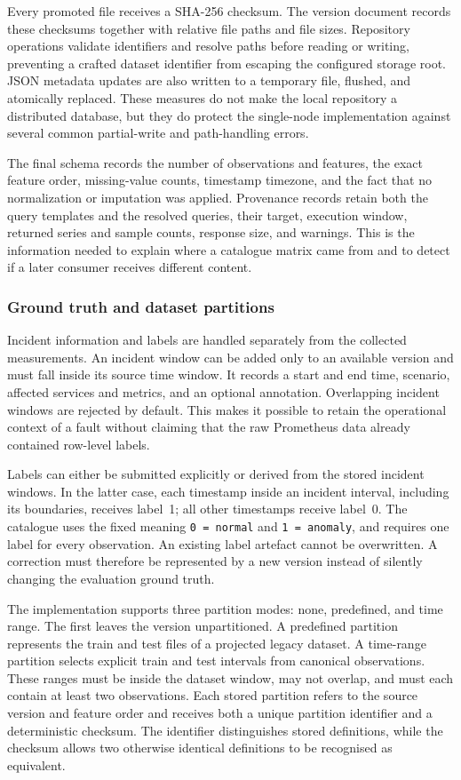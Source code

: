 Every promoted file receives a SHA-256 checksum. The version document records these checksums together with relative file paths and file sizes. Repository operations validate identifiers and resolve paths before reading or writing, preventing a crafted dataset identifier from escaping the configured storage root. JSON metadata updates are also written to a temporary file, flushed, and atomically replaced. These measures do not make the local repository a distributed database, but they do protect the single-node implementation against several common partial-write and path-handling errors.

The final schema records the number of observations and features, the exact feature order, missing-value counts, timestamp timezone, and the fact that no normalization or imputation was applied. Provenance records retain both the query templates and the resolved queries, their target, execution window, returned series and sample counts, response size, and warnings. This is the information needed to explain where a catalogue matrix came from and to detect if a later consumer receives different content.

\subsubsection{Ground truth and dataset partitions}

Incident information and labels are handled separately from the collected measurements. An incident window can be added only to an available version and must fall inside its source time window. It records a start and end time, scenario, affected services and metrics, and an optional annotation. Overlapping incident windows are rejected by default. This makes it possible to retain the operational context of a fault without claiming that the raw Prometheus data already contained row-level labels.

Labels can either be submitted explicitly or derived from the stored incident windows. In the latter case, each timestamp inside an incident interval, including its boundaries, receives label~1; all other timestamps receive label~0. The catalogue uses the fixed meaning \texttt{0 = normal} and \texttt{1 = anomaly}, and requires one label for every observation. An existing label artefact cannot be overwritten. A correction must therefore be represented by a new version instead of silently changing the evaluation ground truth.

The implementation supports three partition modes: none, predefined, and time range. The first leaves the version unpartitioned. A predefined partition represents the train and test files of a projected legacy dataset. A time-range partition selects explicit train and test intervals from canonical observations. These ranges must be inside the dataset window, may not overlap, and must each contain at least two observations. Each stored partition refers to the source version and feature order and receives both a unique partition identifier and a deterministic checksum. The identifier distinguishes stored definitions, while the checksum allows two otherwise identical definitions to be recognised as equivalent.

